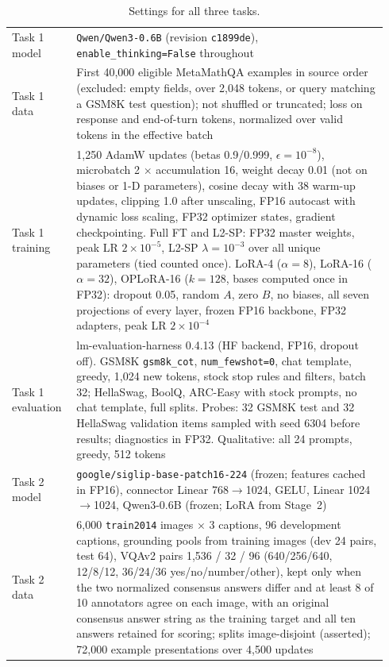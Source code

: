\documentclass{article}
\begin{document}
\begin{table}[h]
\centering
\caption{Settings for all three tasks.}
\label{tab:settings}
\small
\begin{tabular}{p{0.16\linewidth}p{0.78\linewidth}}
\toprule
Task 1 model & \texttt{Qwen/Qwen3-0.6B} (revision \texttt{c1899de}), \texttt{enable\_thinking=False} throughout\\
Task 1 data & First 40,000 eligible MetaMathQA examples in source order (excluded: empty fields, over 2,048 tokens, or query matching a GSM8K test question); not shuffled or truncated; loss on response and end-of-turn tokens, normalized over valid tokens in the effective batch\\
Task 1 training & 1,250 AdamW updates (betas 0.9/0.999, $\epsilon=10^{-8}$), microbatch 2 $\times$ accumulation 16, weight decay 0.01 (not on biases or 1-D parameters), cosine decay with 38 warm-up updates, clipping 1.0 after unscaling, FP16 autocast with dynamic loss scaling, FP32 optimizer states, gradient checkpointing. Full FT and L2-SP: FP32 master weights, peak LR $2\times10^{-5}$, L2-SP $\lambda=10^{-3}$ over all unique parameters (tied counted once). LoRA-4 ($\alpha{=}8$), LoRA-16 ($\alpha{=}32$), OPLoRA-16 ($k{=}128$, bases computed once in FP32): dropout 0.05, random $A$, zero $B$, no biases, all seven projections of every layer, frozen FP16 backbone, FP32 adapters, peak LR $2\times10^{-4}$\\
Task 1 evaluation & lm-evaluation-harness 0.4.13 (HF backend, FP16, dropout off). GSM8K \texttt{gsm8k\_cot}, \texttt{num\_fewshot=0}, chat template, greedy, 1,024 new tokens, stock stop rules and filters, batch 32; HellaSwag, BoolQ, ARC-Easy with stock prompts, no chat template, full splits. Probes: 32 GSM8K test and 32 HellaSwag validation items sampled with seed 6304 before results; diagnostics in FP32. Qualitative: all 24 prompts, greedy, 512 tokens\\
Task 2 model & \texttt{google/siglip-base-patch16-224} (frozen; features cached in FP16), connector Linear 768$\to$1024, GELU, Linear 1024$\to$1024, Qwen3-0.6B (frozen; LoRA from Stage~2)\\
Task 2 data & 6,000 \texttt{train2014} images $\times$ 3 captions, 96 development captions, grounding pools from training images (dev 24 pairs, test 64), VQAv2 pairs 1,536 / 32 / 96 (640/256/640, 12/8/12, 36/24/36 yes/no/number/other), kept only when the two normalized consensus answers differ and at least 8 of 10 annotators agree on each image, with an original consensus answer string as the training target and all ten answers retained for scoring; splits image-disjoint (asserted); 72,000 example presentations over 4,500 updates\\

\end{tabular}
\end{table}
\end{document}
